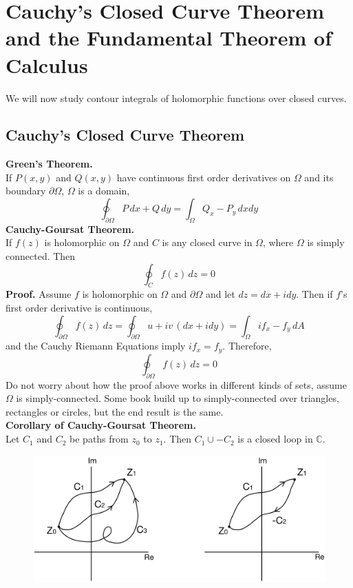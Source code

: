 \documentclass[11pt]{article}
\begin{document}
\section{Cauchy's Closed Curve Theorem and the Fundamental Theorem of Calculus}
We will now study contour integrals of holomorphic functions over closed curves. 
\subsection{Cauchy's Closed Curve Theorem}
\textbf{Green's Theorem.} \\
If $P(x, y)$ and $Q(x, y)$ have continuous first order derivatives on $\Omega$ and its boundary $\partial \Omega$, $\Omega$ is a domain, 
$$\oint_{\partial \Omega} P \,dx + Q \,dy = \int_\Omega Q_x - P_y \,dxdy$$
\newline
\textbf{Cauchy-Goursat Theorem.} \\
If $f(z)$ is holomorphic on $\Omega$ and $C$ is any closed curve in $\Omega$, where $\Omega$ is simply connected. Then
$$\oint_{C} f(z) \, dz = 0$$
\textbf{Proof.} Assume $f$ is holomorphic on $\Omega$ and $\partial \Omega$ and let $dz = dx + idy$. Then if $f$'s first order derivative is continuous,
$$\oint_{\partial \Omega} f(z) \, dz = \oint_{\partial \Omega} u + iv \,{(dx + idy)} = \int_{\Omega}{if_x - f_y} \, dA$$
and the Cauchy Riemann Equations imply $if_x = f_y$. Therefore, 
$$\oint_{\partial \Omega} f(z) \, dz = 0$$
Do not worry about how the proof above works in different kinds of sets, assume $\Omega$ is simply-connected. Some book build up to simply-connected over triangles, rectangles or circles, but the end result is the same. \\
\newline
\textbf{Corollary of Cauchy-Goursat Theorem.} \\
Let $C_1$ and $C_2$ be paths from $z_0$ to $z_1$. Then $C_1 \cup -C_2$ is a closed loop in $\mathbb{C}$. 
\begin{figure}[H]
\includegraphics[scale = 0.2]{12_1}
\centering
\end{figure}
\end{document}
